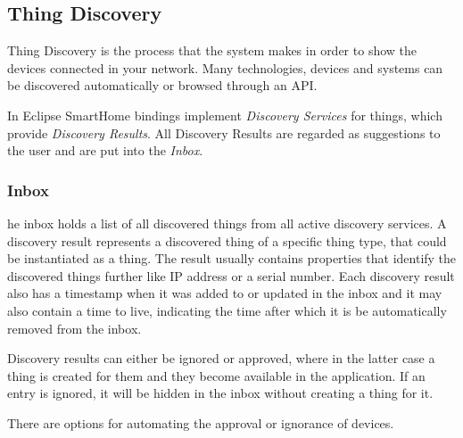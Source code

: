 \subsection{Thing Discovery}
Thing Discovery is the process that the system makes in order to show the devices connected in your network. Many technologies, 
devices and systems can be discovered automatically or browsed through an API.

In Eclipse SmartHome bindings implement \textit{Discovery Services} for things, which provide \textit{Discovery Results}. All Discovery 
Results are regarded as suggestions to the user and are put into the \textit{Inbox}.

\subsubsection{Inbox}
he inbox holds a list of all discovered things from all active discovery services. A discovery result represents a discovered thing of a 
specific thing type, that could be instantiated as a thing. The result usually contains properties that identify the discovered things 
further like IP address or a serial number. Each discovery result also has a timestamp when it was added to or updated in the inbox 
and it may also contain a time to live, indicating the time after which it is be automatically removed from the inbox.

Discovery results can either be ignored or approved, where in the latter case a thing is created for them and they become available in 
the application. If an entry is ignored, it will be hidden in the inbox without creating a thing for it.

There are options for automating the approval or ignorance of devices.




